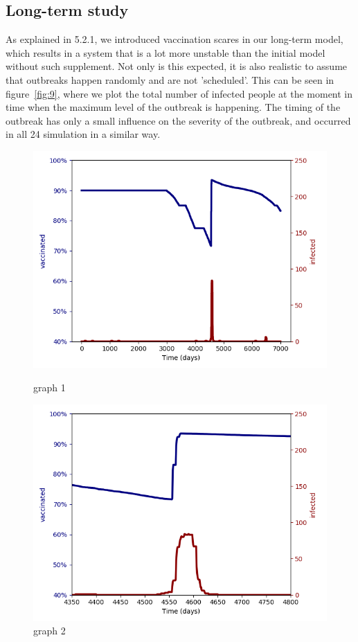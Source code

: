 \documentclass[11pt]{article}
\begin{document}
\subsection{Long-term study}
As explained in 5.2.1, we introduced vaccination scares in our long-term model, which results in a system that is a lot more unstable than the initial model without such supplement. Not only is this expected, it is also realistic to assume that outbreaks happen randomly and are not 'scheduled'. This can be seen in figure~\ref{fig:9}, where we plot the total number of infected people at the moment in time when the maximum level of the outbreak is happening. The timing of the outbreak has only a small influence on the severity of the outbreak, and occurred in all 24 simulation in a similar way. 
\begin{figure}
\centering
\begin{minipage}{.5\textwidth}
  \centering
  \includegraphics[width=1\linewidth]{04a10000200001p2fixedtime5001p5sv0p001}
  \caption{graph 1}  
  \label{fig:7}
  
\end{minipage}%
\begin{minipage}{.5\textwidth}
  \centering
  \includegraphics[width=1\linewidth]{04b10000200001p2fixedtime5001p5sv0p001}
  \caption{graph 2}
  \label{fig:8}
 
\end{minipage}%
\end{figure}
\end{document}
